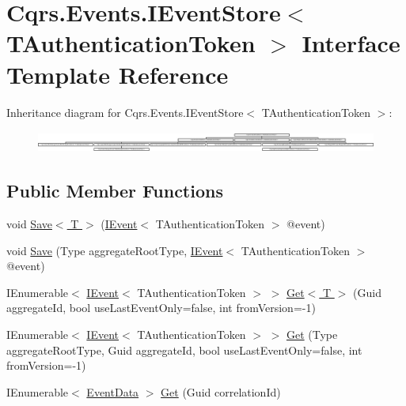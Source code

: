 \hypertarget{interfaceCqrs_1_1Events_1_1IEventStore}{}\section{Cqrs.\+Events.\+I\+Event\+Store$<$ T\+Authentication\+Token $>$ Interface Template Reference}
\label{interfaceCqrs_1_1Events_1_1IEventStore}
Inheritance diagram for Cqrs.\+Events.\+I\+Event\+Store$<$ T\+Authentication\+Token $>$\+:\begin{figure}[H]
\begin{center}
\leavevmode
\includegraphics[height=0.719332cm]{interfaceCqrs_1_1Events_1_1IEventStore}
\end{center}
\end{figure}
\subsection*{Public Member Functions}
\begin{DoxyCompactItemize}
\item 
void \hyperlink{interfaceCqrs_1_1Events_1_1IEventStore_a92e768243d6602d09b786bbd06811ce6_a92e768243d6602d09b786bbd06811ce6}{Save$<$ T $>$} (\hyperlink{interfaceCqrs_1_1Events_1_1IEvent}{I\+Event}$<$ T\+Authentication\+Token $>$ @event)
\item 
void \hyperlink{interfaceCqrs_1_1Events_1_1IEventStore_a81fb586703e7c6dea6b23d9a95f3887a_a81fb586703e7c6dea6b23d9a95f3887a}{Save} (Type aggregate\+Root\+Type, \hyperlink{interfaceCqrs_1_1Events_1_1IEvent}{I\+Event}$<$ T\+Authentication\+Token $>$ @event)
\item 
I\+Enumerable$<$ \hyperlink{interfaceCqrs_1_1Events_1_1IEvent}{I\+Event}$<$ T\+Authentication\+Token $>$ $>$ \hyperlink{interfaceCqrs_1_1Events_1_1IEventStore_add6227e2978ff8656aad79b1a51bf34c_add6227e2978ff8656aad79b1a51bf34c}{Get$<$ T $>$} (Guid aggregate\+Id, bool use\+Last\+Event\+Only=false, int from\+Version=-\/1)
\item 
I\+Enumerable$<$ \hyperlink{interfaceCqrs_1_1Events_1_1IEvent}{I\+Event}$<$ T\+Authentication\+Token $>$ $>$ \hyperlink{interfaceCqrs_1_1Events_1_1IEventStore_ae02ef6c804d0c4a92705a447bc4b2214_ae02ef6c804d0c4a92705a447bc4b2214}{Get} (Type aggregate\+Root\+Type, Guid aggregate\+Id, bool use\+Last\+Event\+Only=false, int from\+Version=-\/1)
\item 
I\+Enumerable$<$ \hyperlink{classCqrs_1_1Events_1_1EventData}{Event\+Data} $>$ \hyperlink{interfaceCqrs_1_1Events_1_1IEventStore_af398bb6768fa661ad97a9fa9ecfbd9fb_af398bb6768fa661ad97a9fa9ecfbd9fb}{Get} (Guid correlation\+Id)
\end{DoxyCompactItemize}


